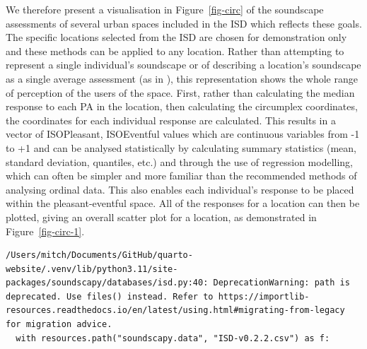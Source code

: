 \documentclass[
  authoryear,
  preprint,
  3p]{elsarticle}
\begin{document}
We therefore present a visualisation in Figure~\ref{fig-circ} of the
soundscape assessments of several urban spaces included in the ISD
\citep{Mitchell2021International} which reflects these goals. The
specific locations selected from the ISD are chosen for demonstration
only and these methods can be applied to any location. Rather than
attempting to represent a single individual's soundscape or of
describing a location's soundscape as a single average assessment (as in
\citet{Mitchell2021Investigating}), this representation shows the whole
range of perception of the users of the space. First, rather than
calculating the median response to each PA in the location, then
calculating the circumplex coordinates, the coordinates for each
individual response are calculated. This results in a vector of
ISOPleasant, ISOEventful values which are continuous variables from -1
to +1 and can be analysed statistically by calculating summary
statistics (mean, standard deviation, quantiles, etc.) and through the
use of regression modelling, which can often be simpler and more
familiar than the recommended methods of analysing ordinal data. This
also enables each individual's response to be placed within the
pleasant-eventful space. All of the responses for a location can then be
plotted, giving an overall scatter plot for a location, as demonstrated
in Figure~\ref{fig-circ-1}.

\begin{verbatim}
/Users/mitch/Documents/GitHub/quarto-website/.venv/lib/python3.11/site-packages/soundscapy/databases/isd.py:40: DeprecationWarning: path is deprecated. Use files() instead. Refer to https://importlib-resources.readthedocs.io/en/latest/using.html#migrating-from-legacy for migration advice.
  with resources.path("soundscapy.data", "ISD-v0.2.2.csv") as f:
\end{verbatim}
\end{document}

